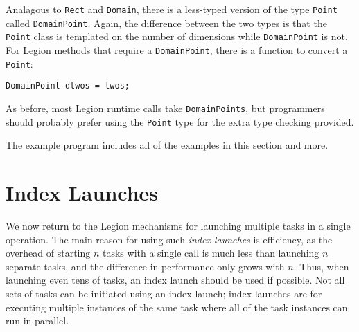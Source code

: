 Analagous to {\tt Rect} and {\tt Domain}, there is a less-typed version of the type {\tt Point} called {\tt DomainPoint}.
Again, the difference between the two types is that the {\tt Point} class is templated on the number of dimensions 
while {\tt DomainPoint} is not.  For Legion methods that require a {\tt DomainPoint}, there is a function to convert a
{\tt Point}:
\begin{verbatim}
DomainPoint dtwos = twos;
\end{verbatim}
As before, most Legion runtime calls take {\tt DomainPoints}, but programmers should probably prefer using the {\tt Point} type
for the extra type checking provided.

The example program  includes all of the examples in this section and more.

\section{Index Launches}
\label{sec:indexlaunch}

We now return to the Legion mechanisms for launching multiple tasks in a
single operation.  The main reason for using such {\em index launches}
is efficiency, as the overhead of starting $n$ tasks with a single
call is much less than launching $n$ separate tasks, and the
difference in performance only grows with $n$.  Thus, when launching
even tens of tasks, an index launch should be used if possible.  Not
all sets of tasks can be initiated using an index launch; 
index launches are for executing multiple instances of the same task
where all of the task instances can run in parallel.

